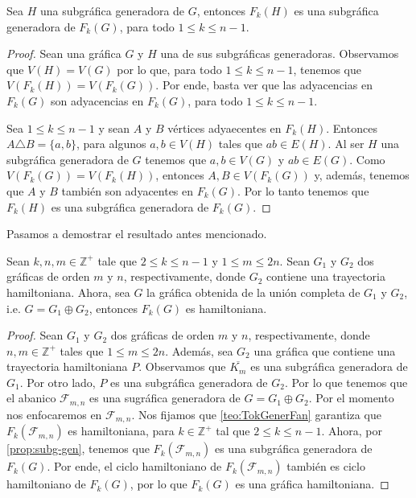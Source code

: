 
\begin{proposicion}
\label{prop:subg-gen}
    Sea $H$ una subgr\'afica generadora de $G$, entonces $F_k(H)$ es una
    subgr\'afica generadora de $F_k(G)$, para todo $1 \leq k \leq n-1$.
\end{proposicion}

\begin{proof}
    Sean una gr\'afica $G$ y $H$ una de sus subgr\'aficas generadoras.
    Observamos que $V(H)=V(G)$ por lo que, para todo $1 \leq k \leq n-1$,
    tenemos que $V(F_k(H))=V(F_k(G))$. Por ende, basta ver que las adyacencias
    en $F_k(G)$ son adyacencias en $F_k(G)$, para todo $1 \leq k \leq n-1$.

    Sea $1 \leq k \leq n-1$ y sean $A$ y $B$ v\'ertices adyaecentes en $F_k(H)$.
    Entonces $ A \triangle B = \{a,b\}$, para algunos $a,b \in V(H)$ tales que
    $ab \in E(H)$. Al ser $H$ una subgr\'afica generadora de $G$ tenemos que
    $a,b \in V(G)$ y $ab \in E(G)$. Como $V(F_k(G))=V(F_k(H))$, entonces $A,B
    \in V(F_k(G))$ y, adem\'as, tenemos que $A$ y $B$ tambi\'en son adyacentes
    en $F_k(G)$. Por lo tanto tenemos que $F_k(H)$ es una subgr\'afica
    generadora de $F_k(G)$.
\end{proof}


Pasamos a demostrar el resultado antes mencionado.

\begin{corolario}
    Sean $k,n,m \in \mathbb{Z^{+}}$ tale que $2 \leq k \leq n-1$ y $1 \leq m
    \leq 2n$. Sean $G_1$ y $G_2$ dos gr\'aficas de orden $m$ y $n$,
    respectivamente, donde $G_2$ contiene una trayectoria hamiltoniana. Ahora,
    sea $G$ la gr\'afica obtenida de la uni\'on completa de $G_1$ y $G_2$, i.e.
    $G = G_1 \oplus G_2$, entonces $F_k(G)$ es hamiltoniana. 
\end{corolario}

\begin{proof}
    Sean $G_1$ y $G_2$ dos gr\'aficas de orden $m$ y $n$, respectivamente, donde
    $n,m \in \mathbb{Z^{+}}$ tales que $1 \leq m \leq 2n$. Adem\'as, sea $G_2$
    una gr\'afica que contiene una trayectoria hamiltoniana $P$. Observamos que
    $\overline{K_m}$ es una subgr\'afica generadora de $G_1$. Por otro lado, $P$
    es una subgr\'afica generadora de $G_2$. Por lo que tenemos que el abanico
    $\mathcal{F}_{m,n}$ es una sugr\'afica generadora de $G= G_1 \oplus G_2$.
    Por el momento nos enfocaremos en $\mathcal{F}_{m,n}$. Nos fijamos que
    \cref{teo:TokGenerFan} garantiza que $F_k(\mathcal{F}_{m,n})$ es
    hamiltoniana, para $k \in \mathbb{Z^{+}}$ tal que $2 \leq k \leq n-1$.
    Ahora, por \cref{prop:subg-gen}, tenemos que $F_k(\mathcal{F}_{m,n})$ es una
    subgr\'afica generadora de $F_k(G)$. Por ende, el ciclo hamiltoniano de
    $F_k(\mathcal{F}_{m,n})$ tambi\'en es ciclo hamiltoniano de $F_k(G)$, por lo
    que $F_k(G)$ es una gr\'afica hamiltoniana.
\end{proof}

